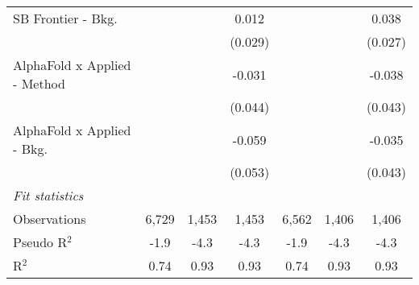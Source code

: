 \begin{tabular}{lcccccc}
   SB Frontier - Bkg.           &              &         & 0.012     &               &             & 0.038\\   
                                &              &         & (0.029)   &               &             & (0.027)\\   
   AlphaFold x Applied - Method &              &         & -0.031    &               &             & -0.038\\   
                                &              &         & (0.044)   &               &             & (0.043)\\   
   AlphaFold x Applied - Bkg.   &              &         & -0.059    &               &             & -0.035\\   
                                &              &         & (0.053)   &               &             & (0.043)\\   
   \midrule
   \emph{Fit statistics}\\
   Observations                 & 6,729        & 1,453   & 1,453     & 6,562         & 1,406       & 1,406\\  
   Pseudo R$^2$                 & -1.9         & -4.3    & -4.3      & -1.9          & -4.3        & -4.3\\  
   R$^2$                        & 0.74         & 0.93    & 0.93      & 0.74          & 0.93        & 0.93\\  
   

\end{tabular}
